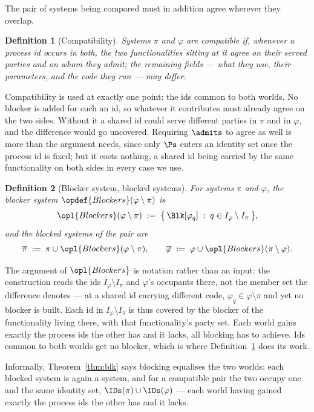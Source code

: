 \documentclass[10pt,oneside,openany]{book}
\theoremstyle{accentdef}
\newtheorem{definition}{Definition}[chapter]
\theoremstyle{accentplain}
\begin{document}
The pair of systems being compared must in addition agree wherever they overlap.

\begin{definition}[Compatibility]\label{def:compat}
Systems $\pi$ and $\varphi$ are \emph{compatible} if, whenever a process id occurs in both, the
two functionalities sitting at it agree on their served parties and on whom they admit; the
remaining fields --- what they use, their parameters, and the code they run --- may differ.
\end{definition}

Compatibility is used at exactly one point: the ids common to both worlds. No blocker is added
for such an id, so whatever it contributes must already agree on the two sides. Without it a
shared id could serve different parties in $\pi$ and in $\varphi$, and the difference would go
uncovered. Requiring $\admits$ to agree as well is more than the argument needs, since only $\Ps$ enters an
identity set once the process id is fixed; but it costs nothing, a shared id being carried by the
same functionality on both sides in every case we use.


\begin{definition}[Blocker system, blocked systems]\label{def:blksys}
For systems $\pi$ and $\varphi$, the \emph{blocker system} $\opdef{Blockers}(\varphi \setminus \pi)$ is
\[
  \opl{Blockers}(\varphi \setminus \pi) \;:=\; \bigl\{\, \Blk[\varphi_q] \;:\; q \in I_\varphi \setminus I_\pi \,\bigr\},
\]
and the \emph{blocked systems} of the pair are
\[
  \overline{\pi} \;:=\; \pi \cup \opl{Blockers}(\varphi \setminus \pi),
  \qquad
  \overline{\varphi} \;:=\; \varphi \cup \opl{Blockers}(\pi \setminus \varphi).
\]
\end{definition}

The argument of $\opl{Blockers}$ is notation rather than an input: the construction reads the ids
$I_\varphi \setminus I_\pi$ and $\varphi$'s occupants there, not the member set the difference
denotes --- at a shared id carrying different code, $\varphi_q \in \varphi \setminus \pi$ and yet
no blocker is built.
Each id in $I_\varphi \setminus I_\pi$ is thus covered by the blocker of the functionality living
there, with that functionality's party set. Each world gains exactly the process ids the other has
and it lacks, all blocking has to achieve. Ids common to both worlds get no blocker, which is
where Definition~\ref{def:compat} does its work.

Informally, Theorem~\ref{thm:blk} says blocking equalises the two worlds: each blocked system is
again a system, and for a compatible pair the two occupy one and the same identity set,
$\IDs(\pi) \cup \IDs(\varphi)$ --- each world having gained exactly the process ids the other
has and it lacks.
\end{document}
